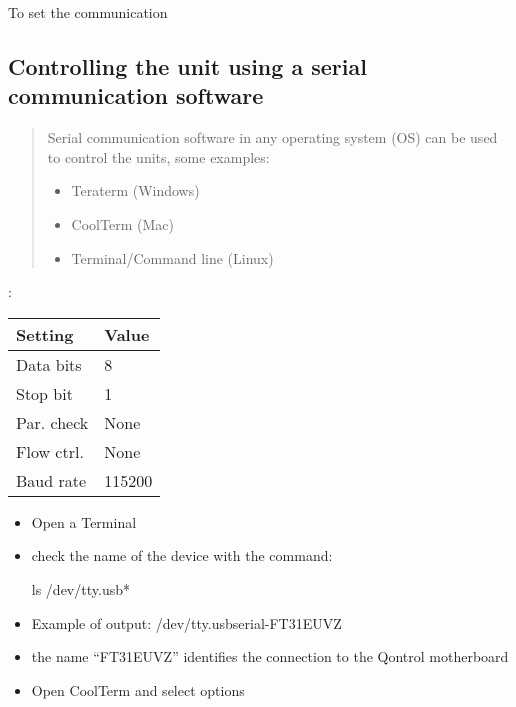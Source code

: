 \documentclass[letterpaper,10pt,english]{sphinxmanual}
\begin{document}
To set the communication


\subsection{Controlling the unit using a serial communication software}
\label{\detokenize{guide/getting_started:controlling-the-unit-using-a-serial-communication-software}}\begin{quote}

Serial communication software in any operating system (OS) can be used to control the units, some examples:
\begin{itemize}
\item {} 
Teraterm (Windows)

\item {} 
CoolTerm (Mac)

\item {} 
Terminal/Command line (Linux)

\end{itemize}
\end{quote}


 :


\begin{savenotes}\sphinxattablestart
\centering
\begin{tabulary}{\linewidth}[t]{|T|T|}
\hline
\sphinxstyletheadfamily 
Setting
&\sphinxstyletheadfamily 
Value
\\
\hline
Data bits
&
8
\\
\hline
Stop bit
&
1
\\
\hline
Par. check
&
None
\\
\hline
Flow ctrl.
&
None
\\
\hline
Baud rate
&
115200
\\
\hline
\end{tabulary}
\par
\sphinxattableend\end{savenotes}


\begin{itemize}
\item {} 
Open a Terminal

\item {} 
check the name of the device with the command:

ls /dev/tty.usb*

\item {} 
Example of output:
/dev/tty.usbserial-FT31EUVZ

\item {} 
the name “FT31EUVZ” identifies the connection to the Qontrol motherboard

\item {} 
Open CoolTerm and select options

\end{itemize}
\end{document}
